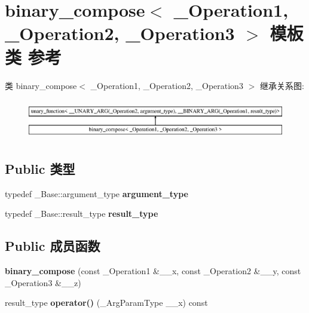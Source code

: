 \hypertarget{classbinary__compose}{}\section{binary\+\_\+compose$<$ \+\_\+\+Operation1, \+\_\+\+Operation2, \+\_\+\+Operation3 $>$ 模板类 参考}
\label{classbinary__compose}
类 binary\+\_\+compose$<$ \+\_\+\+Operation1, \+\_\+\+Operation2, \+\_\+\+Operation3 $>$ 继承关系图\+:\begin{figure}[H]
\begin{center}
\leavevmode
\includegraphics[height=1.763780cm]{classbinary__compose}
\end{center}
\end{figure}
\subsection*{Public 类型}
\begin{DoxyCompactItemize}
\item 
\mbox{\label{classbinary__compose_a25bb94b59482ac0fc441572512b7788f}} 
typedef \+\_\+\+Base\+::argument\+\_\+type {\bfseries argument\+\_\+type}
\item 
\mbox{\label{classbinary__compose_ac3fea7c1a14a0681ecf7ec729c5c2188}} 
typedef \+\_\+\+Base\+::result\+\_\+type {\bfseries result\+\_\+type}
\end{DoxyCompactItemize}
\subsection*{Public 成员函数}
\begin{DoxyCompactItemize}
\item 
\mbox{\label{classbinary__compose_a731192c62d4dbc82ef5ed8799cc791c7}} 
{\bfseries binary\+\_\+compose} (const \+\_\+\+Operation1 \&\+\_\+\+\_\+x, const \+\_\+\+Operation2 \&\+\_\+\+\_\+y, const \+\_\+\+Operation3 \&\+\_\+\+\_\+z)
\item 
\mbox{\label{classbinary__compose_a494c277f3cf2e6380b94ae173b10dd43}} 
result\+\_\+type {\bfseries operator()} (\+\_\+\+Arg\+Param\+Type \+\_\+\+\_\+x) const
\end{DoxyCompactItemize}
